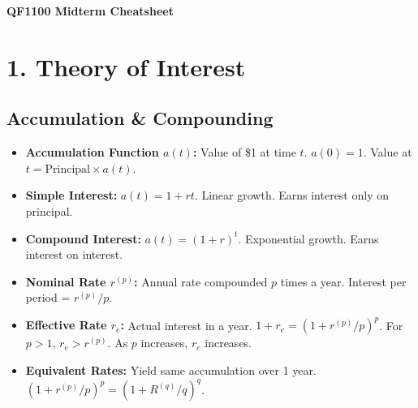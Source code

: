 \documentclass[8pt,a4paper,landscape]{extarticle}
\begin{document}
\begin{multicols*}{3}

    \begin{center}
        \Large \textbf{QF1100 Midterm Cheatsheet}
    \end{center}

    \section{1. Theory of Interest}

    \subsection{Accumulation \& Compounding}
    \begin{itemize}
        \item \textbf{Accumulation Function $a(t)$:} Value of \$1 at time $t$. $a(0)=1$. Value at $t = \text{Principal} \times a(t)$.
        \item \textbf{Simple Interest:} $a(t) = 1 + rt$. Linear growth. Earns interest only on principal.
        \item \textbf{Compound Interest:} $a(t) = (1 + r)^t$. Exponential growth. Earns interest on interest.
        \item \textbf{Nominal Rate $r^{(p)}$:} Annual rate compounded $p$ times a year. Interest per period = $r^{(p)}/p$.
        \item \textbf{Effective Rate $r_e$:} Actual interest in a year. $1 + r_e = (1 + r^{(p)}/p)^p$. For $p>1$, $r_e > r^{(p)}$. As $p$ increases, $r_e$ increases.
        \item \textbf{Equivalent Rates:} Yield same accumulation over 1 year. \linebreak $(1 + r^{(p)}/p)^p = (1 + R^{(q)}/q)^q$.
    \end{itemize}


\end{multicols*}
\end{document}
